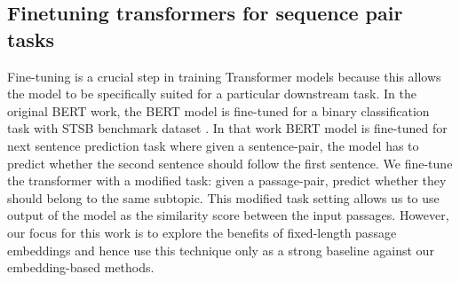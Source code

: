\subsection{Finetuning transformers for sequence pair tasks} Fine-tuning is a crucial step in training Transformer models because this allows the model to be specifically suited for a particular downstream task. In the original BERT work, the BERT model is fine-tuned for a binary classification task with STSB benchmark dataset . In that work BERT model is fine-tuned for next sentence prediction task where given a sentence-pair, the model has to predict whether the second sentence should follow the first sentence. We fine-tune the   transformer with a modified task: given a passage-pair, predict whether they should belong to the same subtopic. This modified task setting allows us to use output of the model as the similarity score between the input passages. However, our focus for this work is to explore the benefits of fixed-length passage embeddings and hence use this technique only as a strong baseline against our embedding-based methods.